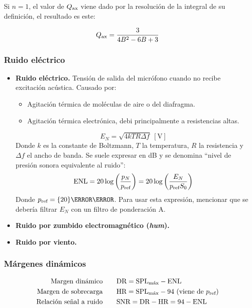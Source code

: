\documentclass[a4paper, 8pt]{extarticle}
\begin{document}
\begin{multicols}{3}
  Si $n = 1$, el valor de $Q _{\textnormal{ax}}$ viene dado por la resolución de la integral de su definición, el resultado es este:

  \[ Q _{\textnormal{ax}} = \frac{3}{4B^2 - 6B + 3} \]


  \subsubsection{Ruido eléctrico}

  \begin{itemize}
    \item \textbf{Ruido eléctrico.} Tensión de salida del micrófono cuando no recibe excitación acústica. Causado por:
          \begin{itemize}
            \item Agitación térmica de moléculas de aire o del diafragma.
            \item Agitación térmica electrónica, debi principalmente a resistencias altas.
          \end{itemize}
          \[ E_N = \sqrt{4kTR \Delta f} \ \left[ \unit{\volt }  \right]\]
          Donde $k$ es la constante de Boltzmann, $T$ la temperatura, $R$ la resistencia y $\Delta f$ el ancho de banda. Se suele expresar en \unit{\dB_{}} y se denomina ``nivel de presión sonora equivalente al ruido'':
          \[ \text{ENL} = 20 \log \left( \frac{p_N}{p _{\textnormal{ref}}} \right)  = 20 \log \left( \frac{E_N}{p _{\textnormal{ref}}S_0} \right) \]
          Donde $p _{\textnormal{ref}} = \qty{20}{\micro\pascal }$. Para usar esta expresión, mencionar que se debería filtrar $E_N$ con un filtro de ponderación A.
    \item \textbf{Ruido por zumbido electromagnético (\textit{hum}).}
    \item \textbf{Ruido por viento.}
  \end{itemize}

  \subsubsection{Márgenes dinámicos}

  \begin{align*}
    \text{Margen dinámico}        & \qquad \text{DR} = \text{SPL}_{\text{máx}} - \text{ENL}                                    \\
    \text{Margen de sobrecarga}   & \qquad \text{HR} = \text{SPL}_{\text{máx}} - 94 \ (\text{viene de } p _{\textnormal{ref}}) \\
    \text{Relación señal a ruido} & \qquad \text{SNR} = \text{DR} - \text{HR} = 94 - \text{ENL}
  \end{align*}

\end{multicols}
\end{document}
